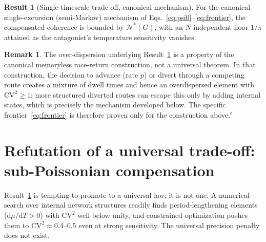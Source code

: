 \documentclass[11pt,onecolumn]{article}
\theoremstyle{definition}
\newtheorem{result}{Result}
\newtheorem{remark}{Remark}
\newcommand{\CV}{\mathrm{CV}}
\newcommand{\Ncoh}{\mathcal{N}}
\newcommand{\dd}{\mathrm{d}}
\begin{document}
\begin{result}[Single-timescale trade-off, canonical mechanism]
\label{res:single}
For the canonical single-excursion (semi-Markov) mechanism of Eqs.~\eqref{eq:psi0}--\eqref{eq:frontier}, the compensated coherence is bounded by $\Ncoh^\ast(G)$, with an $N$-independent floor $1/\pi$ attained as the antagonist's temperature sensitivity vanishes.
\end{result}

\begin{remark}
The over-dispersion underlying Result~\ref{res:single} is a property of the canonical memoryless race-return construction, not a universal theorem. In that construction, the decision to advance (rate $p$) or divert through a competing route creates a mixture of dwell times and hence an overdispersed element with $\CV^2\ge 1$; more structured diverted routes can escape this only by adding internal states, which is precisely the mechanism developed below. The specific frontier~\eqref{eq:frontier} is therefore proven only for the construction above.''
\end{remark}

\section{Refutation of a universal trade-off: sub-Poissonian compensation}
\label{sec:refute}

Result~\ref{res:single} is tempting to promote to a universal law; it is not one. A numerical search over internal network structures readily finds period-lengthening elements ($\dd\mu/\dd T>0$) with $\CV^2$ well below unity, and constrained optimization pushes them to $\CV^2\approx 0.4$--$0.5$ even at strong sensitivity. The universal precision penalty does not exist.
\end{document}
